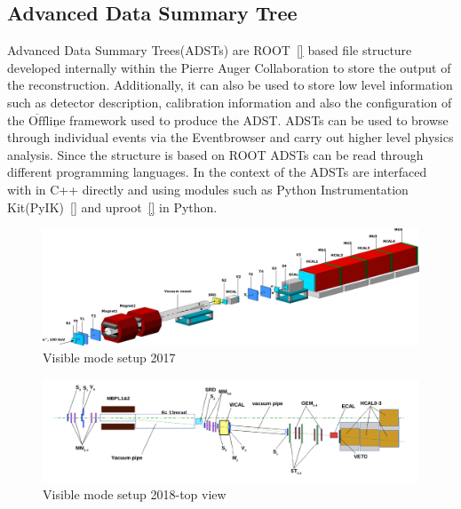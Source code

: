 \subsection{Advanced Data Summary Tree}
\label{sec:ADST}
Advanced Data Summary Trees(ADSTs) are ROOT~\ref{} based file structure developed internally within the Pierre Auger Collaboration to store the output of the reconstruction. Additionally, it can also be used to store low level information such as detector description, calibration information and also the configuration of the $\mathrm{\overline{Off}\underline{line}}$ framework used to produce the ADST. ADSTs can be used to browse through individual events via the Eventbrowser and carry out higher level physics analysis. Since the structure is based on ROOT ADSTs can be read through different programming languages. In the context of the ADSTs are interfaced with in C++ directly and using modules such as Python Instrumentation Kit(PyIK)~\ref{} and uproot~\ref{} in Python. 







\begin{figure}[t!]
\centering
\includegraphics[width=\textwidth]{thesis_figures/Visible_3d_setup.png}
\caption{Visible mode setup 2017~\cite{Banerjee_2018}}
\label{fig:Visible_mode_setup}
\end{figure}

\begin{figure}[t!]
\centering
\includegraphics[width=\textwidth]{thesis_figures/visible_mode_newest.png}
\caption{Visible mode setup 2018-top view~\cite{Gninenko:2677228}}
\label{fig:Visible_mode_setup_side}
\end{figure}



